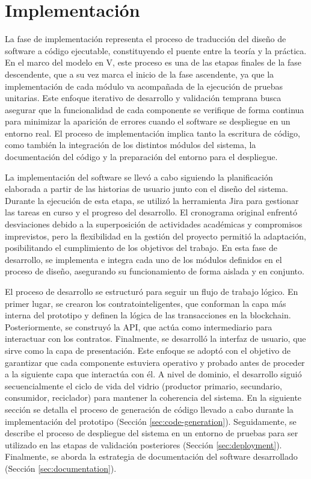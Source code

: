 \chapter[Implementación]{Implementación}
\label{cp:implementation}

\parindent0pt

La fase de implementación representa el proceso de traducción del diseño de \gls{software} a código ejecutable, constituyendo el puente entre la teoría y la práctica. En el marco del modelo en V, este proceso es una de las etapas finales de la fase descendente, que a su vez marca el inicio de la fase ascendente, ya que la implementación de cada módulo va acompañada de la ejecución de pruebas unitarias. Este enfoque iterativo de desarrollo y validación temprana busca asegurar que la funcionalidad de cada componente se verifique de forma continua para minimizar la aparición de errores cuando el software se despliegue en un entorno real. El proceso de implementación implica tanto la escritura de código, como también la integración de los distintos módulos del sistema, la documentación del código y la preparación del entorno para el despliegue.

La implementación del software se llevó a cabo siguiendo la planificación elaborada a partir de las historias de usuario junto con el diseño del sistema. Durante la ejecución de esta etapa, se utilizó la herramienta Jira para gestionar las tareas en curso y el progreso del desarrollo. El cronograma original enfrentó desviaciones debido a la superposición de actividades académicas y compromisos imprevistos, pero la flexibilidad en la gestión del proyecto permitió la adaptación, posibilitando el cumplimiento de los objetivos del trabajo. En esta fase de desarrollo, se implementa e integra cada uno de los módulos definidos en el proceso de diseño, asegurando su funcionamiento de forma aislada y en conjunto.

El proceso de desarrollo se estructuró para seguir un flujo de trabajo lógico. En primer lugar, se crearon los \glspl{contratointeligente}, que conforman la capa más interna del prototipo y definen la lógica de las transacciones en la blockchain. Posteriormente, se construyó la API, que actúa como intermediario para interactuar con los contratos. Finalmente, se desarrolló la interfaz de usuario, que sirve como la capa de presentación. Este enfoque se adoptó con el objetivo de garantizar que cada componente estuviera operativo y probado antes de proceder a la siguiente capa que interactúa con él. A nivel de dominio, el desarrollo siguió secuencialmente el ciclo de vida del vidrio (productor primario, secundario, consumidor, reciclador) para mantener la coherencia del sistema. En la siguiente sección se detalla el proceso de generación de código llevado a cabo durante la implementación del prototipo (Sección \ref{sec:code-generation}). Seguidamente, se describe el proceso de despliegue del sistema en un entorno de pruebas para ser utilizado en las etapas de validación posteriores (Sección \ref{sec:deployment}). Finalmente, se aborda la estrategia de documentación del software desarrollado (Sección \ref{sec:documentation}).

